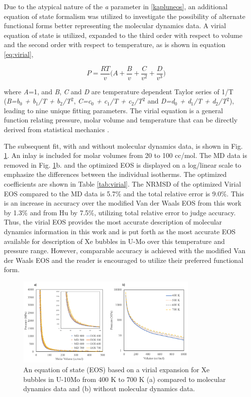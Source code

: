 \documentclass[review]{elsarticle}
\begin{document}
Due to the atypical nature of the \textit{a} parameter in \ref{kapluneos}, an additional equation of state formalism was utilized to investigate the possibility of alternate functional forms better representing the molecular dynamics data. A virial equation of state is utilized, expanded to the third order with respect to volume and the second order with respect to temperature, as is shown in equation \ref{eq:virial}, 

\begin{equation}
\label{eq:virial}
P=\frac{RT}{v}\bigg( A + \frac{B}{v} + \frac{C}{v^2} + \frac{D}{v^3}  \bigg)
\end{equation}

where \textit{A}=1, and \textit{B}, \textit{C} and \textit{D} are temperature dependent Taylor series of 1/T (\textit{B=b$_0$ + b$_1$/T + b$_2$/T$^2$}, \textit{C=c$_0$ + c$_1$/T + c$_2$/T$^2$} and \textit{D=d$_0$ + d$_1$/T + d$_2$/T$^2$}), leading to nine unique fitting parameters. The virial equation is a general function relating pressure, molar volume and temperature that can be directly derived from statistical mechanics \cite{virial}. 

The subsequent fit, with and without molecular dynamics data, is shown in Fig. \ref{fig:xe_eosV}. An inlay is included for molar volumes from 20 to 100 cc/mol. The MD data is removed in Fig. \ref{fig:xe_eosV}b. and the optimized EOS is displayed on a log/linear scale to emphasize the differences between the individual isotherms. The optimized coefficients are shown in Table \ref{tab:virial}. The NRMSD of the optimized Virial EOS compared to the MD data is 5.7\% and the total relative error is 9.0\%. This is an increase in accuracy over the modified Van der Waals EOS from this work by 1.3\% and from Hu by 7.5\%, utilizing total relative error to judge accuracy. Thus, the virial EOS provides the most accurate description of molecular dynamics information in this work and is put forth as the most accurate EOS available for description of Xe bubbles in U-Mo over this temperature and pressure range. However, comparable accuracy is achieved with the modified Van der Waals EOS and the reader is encouraged to utilize their preferred functional form. 

\begin{figure}[h]
 \centering
 \includegraphics[width=0.8\textwidth]{8_xe_eosV.png} 
 \caption{An equation of state (EOS) based on a virial expansion for Xe bubbles in U-10Mo from 400 K to 700 K (a) compared to molecular dynamics data and (b) without molecular dynamics data. }
 \label{fig:xe_eosV}
\end{figure}
\end{document}
